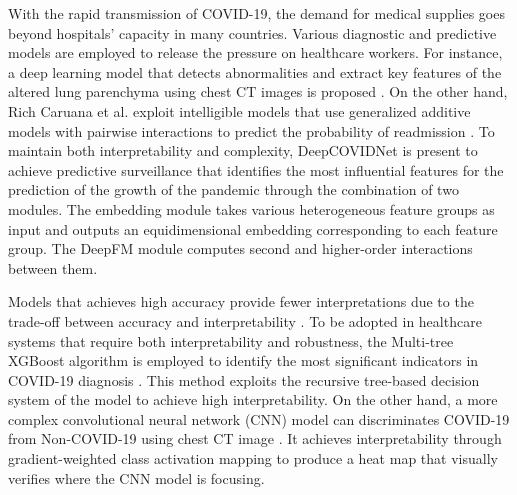 With the rapid transmission of COVID-19, the demand for medical supplies goes beyond hospitals' capacity in many countries. Various diagnostic and predictive models are employed to release the pressure on healthcare workers. For instance, a deep learning model that detects abnormalities and extract key features of the altered lung parenchyma using chest CT images is proposed \cite{Basu2020Deep}. On the other hand, Rich Caruana et al. exploit intelligible models that use generalized additive models with pairwise interactions to predict the probability of readmission \cite{Caruana2015IntelligibleMF}. To maintain both interpretability and complexity, DeepCOVIDNet is present to achieve predictive surveillance that identifies the most influential features for the prediction of the growth of the pandemic\cite{ramch2020deepcovidnet} through the combination of two modules. The embedding module takes various heterogeneous feature groups as input and outputs an equidimensional embedding corresponding to each feature group. The DeepFM \cite{guo2017deepfm} module computes second and higher-order interactions between them.



Models that achieves high accuracy provide fewer interpretations due to the trade-off between accuracy and interpretability \cite{doshivelez2017rigorous}. To be adopted in healthcare systems that require both interpretability and robustness\cite{goodfellow2014explaining}, the Multi-tree XGBoost algorithm is employed to identify the most significant indicators in COVID-19 diagnosis \cite{Yan2020}. This method exploits the recursive tree-based decision system of the model to achieve high interpretability. On the other hand, a more complex convolutional neural network (CNN) model can discriminates COVID-19 from Non-COVID-19 using chest CT image \cite{matsuyama2020deep}. It achieves interpretability through gradient-weighted class activation mapping to produce a heat map that visually verifies where the CNN model is focusing.

